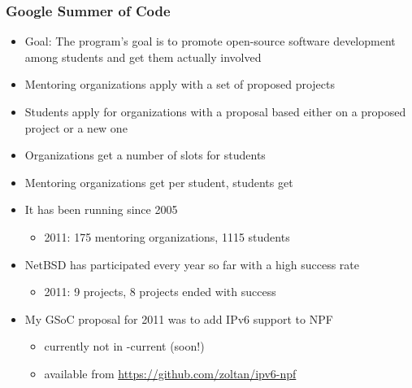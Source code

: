 \documentclass[magyar]{beamer}
\begin{document}
\begin{frame}
\frametitle{Google Summer of Code}
\begin{itemize}
	\item Goal: The program's goal is to promote open-source software development among students and get them actually involved
\pause
	\item Mentoring organizations apply with a set of proposed projects
\pause
	\item Students apply for organizations with a proposal based either on a proposed project or a new one
\pause
	\item Organizations get a number of slots for students
\pause
	\item Mentoring organizations get  per student, students get 
\pause
	\item It has been running since 2005
		\begin{itemize}
			\item 2011: 175 mentoring organizations, 1115 students
		\end{itemize}
	\item NetBSD has participated every year so far with a high success rate
		\begin{itemize}
			\item 2011: 9 projects, 8 projects ended with success
		\end{itemize}
	\item My GSoC proposal for 2011 was to add IPv6 support to NPF
		\begin{itemize}
			\item currently not in -current (soon!)
			\item available from \url{https://github.com/zoltan/ipv6-npf}
		\end{itemize}
\end{itemize}
\end{frame}
\end{document}
